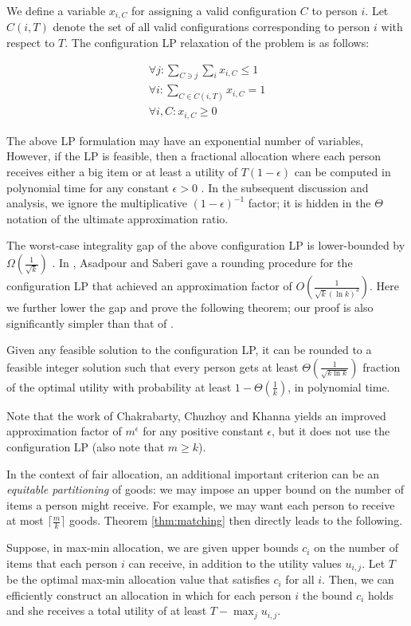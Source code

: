 We define a variable $x_{i,C}$ for assigning a valid configuration $C$ to person $i$.
Let $C(i,T)$ denote the set of all valid configurations corresponding to person $i$ with respect to $T$. The configuration LP relaxation
 of the problem is as follows:

\begin{eqnarray}
\label{eqn:lp}
\forall j: \sum_{C \ni j}\sum_{i} x_{i,C} \leq 1 \\
\forall i: \sum_{C \in C(i,T)} x_{i,C}=1 \nonumber\\
\forall i, C: x_{i,C} \geq 0 \nonumber
\end{eqnarray}

The above LP formulation may have an exponential number of variables, However, if the LP is feasible, then a fractional allocation where each person receives either a big item or at least a utility of $T(1-\epsilon)$ can be computed in
polynomial time for any constant $\epsilon > 0$ \cite{bansal:stoc06}.
In the subsequent discussion and analysis, we ignore the multiplicative
$(1 - \epsilon)^{-1}$ factor; it is hidden in the $\Theta$ notation of
the ultimate approximation ratio.

The worst-case integrality gap of the above configuration LP is
lower-bounded by $\Omega(\frac{1}{\sqrt{k}})$ \cite{bansal:stoc06}.
In \cite{asadpour:stoc07}, Asadpour and Saberi
gave a rounding procedure for the configuration LP that achieved an approximation factor of $O\left(\frac{1}{\sqrt{k}(\ln{k})^3}\right)$. Here we further lower
the gap and prove the following theorem;  our proof is also
significantly simpler than that of \cite{asadpour:stoc07}.


\begin{theorem}
\label{thm:santa1}
Given any feasible solution to the configuration LP, it can be rounded to a feasible integer solution such that every person gets  at least $\Theta\left(\frac{1}{\sqrt{k\ln{k}}}\right)$ fraction of the optimal utility with probability at least $1-\Theta(\frac{1}{k})$, in polynomial time.
\end{theorem}


Note that the work of Chakrabarty, Chuzhoy and Khanna \cite{Chuzhoy09}
yields an improved approximation factor of $m^{\epsilon}$
for any positive constant
$\epsilon$, but it does not use the configuration LP
(also note that $m \geq k$).


In the context of fair allocation, an additional important criterion can be
an \emph{equitable partitioning} of goods: we may impose an upper
bound on the number of items a person might receive. For example,
we may want each person to receive at most $\lceil \frac{m}{k} \rceil$ goods. Theorem \ref{thm:matching} then directly leads to the following.
\begin{theorem}
\label{thm:santa2}
Suppose, in max-min allocation, we are given upper bounds $c_{i}$ on the
number of items that each person $i$ can receive, in addition to the
 utility values $u_{i,j}$. Let $T$ be the optimal max-min allocation value
that satisfies $c_i$ for all $i$. Then, we can efficiently construct an allocation
in which for each person $i$ the bound $c_i$ holds and she receives a total
utility of at least $T - \max_{j} u_{i,j}$.
\end{theorem}

